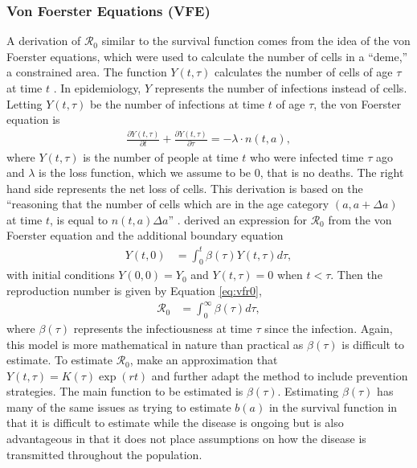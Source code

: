 \documentclass[12pt]{article}
\newcommand{\rr}{\ensuremath{\mathcal{R}_0}}
\begin{document}

\subsubsection{Von Foerster Equations (VFE)}
\label{sec:direct-estim-surv}

A derivation of $\rr$ similar to the survival function comes from the idea of the von Foerster equations, which were used to calculate the number of cells in a ``deme,'' a constrained area.  The function $Y(t, \tau)$ calculates the number of cells of age $\tau$ at time $t$ \citep{trucco1965}.  In epidemiology, $Y$ represents the number of infections instead of cells. Letting $Y(t, \tau)$ be the number of infections at time $t$ of age $\tau$, the von Foerster equation is
\begin{align*}
  \frac{\partial Y(t, \tau)}{\partial t} +   \frac{\partial Y(t, \tau)}{\partial \tau} = -  \lambda \cdot n(t, a) ,
\end{align*}
where $Y(t,\tau)$ is the number of people at time $t$ who were infected time $\tau$ ago and $\lambda$ is the loss function, which we assume to be 0, that is no deaths.  The right hand side represents the net loss of cells.  This derivation is based on the ``reasoning that the number of cells which are in the age category $(a, a + \Delta a)$ at time $t$, is equal to $n(t,a) \Delta a$'' \citep{trucco1965}.     \cite{fraser2004factors} derived an expression for $\rr$ from the von Foerster equation and the additional boundary equation
\begin{align*}
  Y(t,0) &= \int_0^t \beta( \tau) Y(t, \tau) d \tau,
\end{align*}
with initial conditions $Y(0,0) = Y_0$ and $Y(t, \tau) = 0$ when $t < \tau$.  Then the reproduction number is given by Equation \ref{eq:vfr0},
\begin{align}\label{eq:vfr0}
\rr &= \int_0^\infty \beta(\tau) d\tau,
\end{align}
 where $\beta (\tau)$ represents the infectiousness at time $\tau$ since the infection.    Again, this model is more mathematical in nature than practical as $\beta (\tau)$ is difficult to estimate.  To estimate $\rr$, \cite{fraser2004factors} make an approximation that $Y(t, \tau) = K(\tau) \exp (rt)$ and further adapt the method to include prevention strategies.  The main function to be estimated is $\beta (\tau)$.  Estimating $\beta (\tau)$ has many of the same issues as trying to estimate $b(a)$ in the survival function in that it is difficult to estimate while the disease is ongoing but is also advantageous in that it does not place assumptions on how the disease is transmitted throughout the population.
\end{document}
